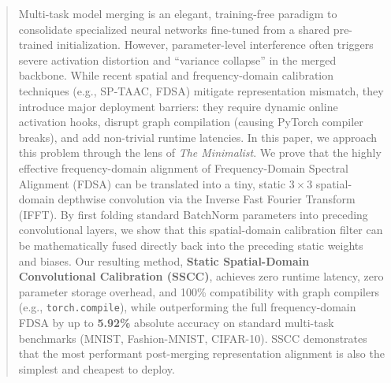 \documentclass{article}
\theoremstyle{plain}
\theoremstyle{definition}
\theoremstyle{remark}
\begin{document}

\printAffiliationsAndNotice{}

\begin{abstract}
  Multi-task model merging is an elegant, training-free paradigm to consolidate specialized neural networks fine-tuned from a shared pre-trained initialization. However, parameter-level interference often triggers severe activation distortion and ``variance collapse'' in the merged backbone. While recent spatial and frequency-domain calibration techniques (e.g., SP-TAAC, FDSA) mitigate representation mismatch, they introduce major deployment barriers: they require dynamic online activation hooks, disrupt graph compilation (causing PyTorch compiler breaks), and add non-trivial runtime latencies. In this paper, we approach this problem through the lens of \textit{The Minimalist}. We prove that the highly effective frequency-domain alignment of Frequency-Domain Spectral Alignment (FDSA) can be translated into a tiny, static $3 \times 3$ spatial-domain depthwise convolution via the Inverse Fast Fourier Transform (IFFT). By first folding standard BatchNorm parameters into preceding convolutional layers, we show that this spatial-domain calibration filter can be mathematically fused directly back into the preceding static weights and biases. Our resulting method, \textbf{Static Spatial-Domain Convolutional Calibration (SSCC)}, achieves zero runtime latency, zero parameter storage overhead, and 100\% compatibility with graph compilers (e.g., \texttt{torch.compile}), while outperforming the full frequency-domain FDSA by up to \textbf{5.92\%} absolute accuracy on standard multi-task benchmarks (MNIST, Fashion-MNIST, CIFAR-10). SSCC demonstrates that the most performant post-merging representation alignment is also the simplest and cheapest to deploy.
\end{abstract}
\end{document}
